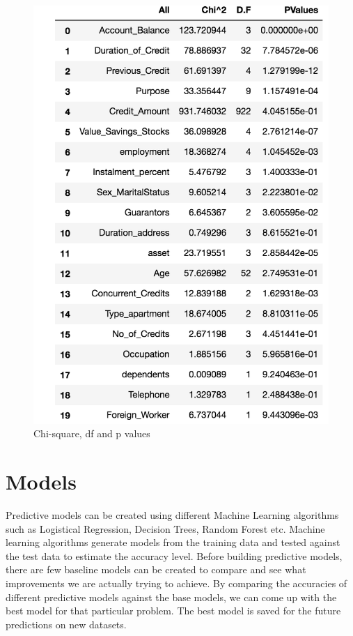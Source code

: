 \documentclass[sigconf]{acmart}
\begin{document}
\begin{figure}[htb]
  \centering
  \includegraphics[width=1.0\columnwidth]{images/Figure17.png}
  \caption{Chi-square, df and p values}
  \label{fig:Figure17} 
\end{figure}

\section{Models}

Predictive models can be created using different Machine Learning algorithms such as Logistical Regression, Decision Trees, Random Forest etc. Machine learning algorithms generate models from the training data and tested against the test data to estimate the accuracy level. Before building predictive models, there are few baseline models can be created to compare and see what improvements we are actually trying to achieve. By comparing the accuracies of different predictive models against the base models, we can come up with the best model for that particular problem. The best model is saved for the future predictions on new datasets.
\end{document}
